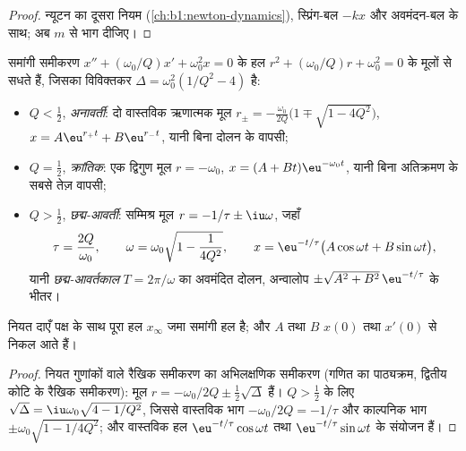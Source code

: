 \begin{proof}
न्यूटन का दूसरा नियम (\cref{ch:b1:newton-dynamics}), स्प्रिंग-बल
$-kx$ और अवमंदन-बल के साथ; अब $m$ से भाग दीजिए।
\end{proof}

\begin{theorem}[तीन व्यवस्थाएँ]\label{thm:b1:transient-regimes:regimes}
समांगी समीकरण $x'' + (\omega_0/Q)x' +
\omega_0^2 x = 0$ के हल $r^2 + (\omega_0/Q)r +
\omega_0^2 = 0$ के मूलों से सधते हैं, जिसका विविक्तकर $\Delta = \omega_0^2(1/Q^2 - 4)$ है:
\begin{itemize}
  \item $Q < \tfrac12$, \emph{अनावर्ती}: दो वास्तविक ऋणात्मक मूल
        $r_\pm = -\frac{\omega_0}{2Q}\big(1 \mp \sqrt{1 - 4Q^2}\big)$,
        $x = A\eu^{r_+t} + B\eu^{r_-t}$, यानी बिना दोलन के वापसी;
  \item $Q = \tfrac12$, \emph{क्रांतिक}: एक द्विगुण मूल $r = -\omega_0$,
        $x = (A + Bt)\eu^{-\omega_0 t}$, यानी बिना अतिक्रमण के सबसे तेज़
        वापसी;
  \item $Q > \tfrac12$, \emph{छद्म-आवर्ती}: सम्मिश्र मूल
        $r = -1/\tau \pm \iu\omega$, जहाँ
        \[
        \tau = \frac{2Q}{\omega_0}, \qquad
        \omega = \omega_0\sqrt{1 - \frac{1}{4Q^2}},
        \qquad
        x = \eu^{-t/\tau}\big(A\cos\omega t + B\sin\omega t\big),
        \]
        यानी \emph{छद्म-आवर्तकाल} $T = 2\pi/\omega$ का अवमंदित दोलन,
        अन्वालोप $\pm\sqrt{A^2 + B^2}\,\eu^{-t/\tau}$ के भीतर।
\end{itemize}
नियत दाएँ पक्ष के साथ पूरा हल $x_\infty$ जमा समांगी हल है; और
$A$ तथा $B$ $x(0)$ तथा $x'(0)$ से निकल आते हैं।
\end{theorem}

\begin{proof}
नियत गुणांकों वाले रैखिक समीकरण का अभिलक्षणिक समीकरण (गणित का पाठ्यक्रम,
द्वितीय कोटि के रैखिक समीकरण): मूल $r = -\omega_0/2Q \pm \tfrac12\sqrt\Delta$
हैं। $Q > \tfrac12$ के लिए
$\sqrt\Delta = \iu\omega_0\sqrt{4 - 1/Q^2}$,
जिससे वास्तविक भाग $-\omega_0/2Q = -1/\tau$
और काल्पनिक भाग $\pm\omega_0\sqrt{1 - 1/4Q^2}$; और वास्तविक हल $\eu^{-t/\tau}\cos\omega t$ तथा
$\eu^{-t/\tau}\sin\omega t$ के संयोजन हैं।
\end{proof}

